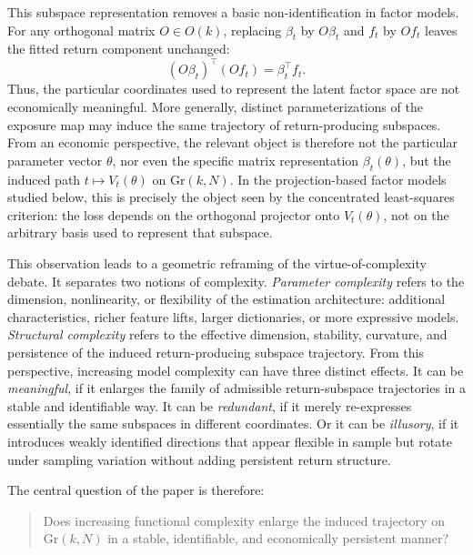 \documentclass[11pt,letterpaper]{article}
\newcommand{\gr}{\mathrm{Gr}}
\begin{document}
This subspace representation removes a basic non-identification in factor models. For any orthogonal matrix $O\in O(k)$, replacing $\beta_t$ by $O\beta_t$ and $f_t$ by $Of_t$ leaves the fitted return component unchanged:
\begin{equation*}
	(O\beta_t)^\top(Of_t)=\beta_t^\top f_t.
\end{equation*}
Thus, the particular coordinates used to represent the latent factor space are not economically meaningful. More generally, distinct parameterizations of the exposure map may induce the same trajectory of return-producing subspaces. From an economic perspective, the relevant object is therefore not the particular parameter vector $\theta$, nor even the specific matrix representation $\beta_t(\theta)$, but the induced path $t \mapsto V_t(\theta)$ on $\gr(k,N)$. In the projection-based factor models studied below, this is precisely the object seen by the concentrated least-squares criterion: the loss depends on the orthogonal projector onto $V_t(\theta)$, not on the arbitrary basis used to represent that subspace.

This observation leads to a geometric reframing of the virtue-of-complexity debate. It separates two notions of complexity. \emph{Parameter complexity} refers to the dimension, nonlinearity, or flexibility of the estimation architecture: additional characteristics, richer feature lifts, larger dictionaries, or more expressive models. \emph{Structural complexity} refers to the effective dimension, stability, curvature, and persistence of the induced return-producing subspace trajectory. From this perspective, increasing model complexity can have three distinct effects. It can be \emph{meaningful}, if it enlarges the family of admissible return-subspace trajectories in a stable and identifiable way. It can be \emph{redundant}, if it merely re-expresses essentially the same subspaces in different coordinates. Or it can be \emph{illusory}, if it introduces weakly identified directions that appear flexible in sample but rotate under sampling variation without adding persistent return structure.

The central question of the paper is therefore:
\begin{quote}
	Does increasing functional complexity enlarge the induced trajectory on $\gr(k,N)$ in a stable, identifiable, and economically persistent manner?
\end{quote}
\end{document}
